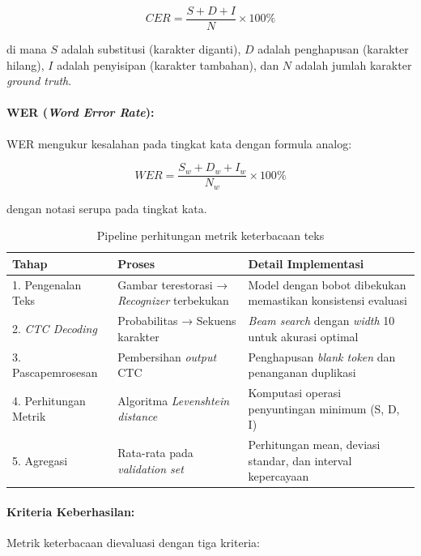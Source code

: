 \documentclass[12pt,a4paper]{article}
\begin{document}
\begin{equation}
CER = \frac{S + D + I}{N} \times 100\%
\end{equation}

di mana $S$ adalah substitusi (karakter diganti), $D$ adalah penghapusan (karakter hilang), $I$ adalah penyisipan (karakter tambahan), dan $N$ adalah jumlah karakter \textit{ground truth}.

\paragraph{WER (\textit{Word Error Rate}):}
WER mengukur kesalahan pada tingkat kata dengan formula analog:

\begin{equation}
WER = \frac{S_w + D_w + I_w}{N_w} \times 100\%
\end{equation}

dengan notasi serupa pada tingkat kata.

\begin{table}[H]
\centering
\caption{Pipeline perhitungan metrik keterbacaan teks}
\label{tab:readability-pipeline}
\small
\begin{tabular}{|l|p{5cm}|p{6cm}|}
\hline
\textbf{Tahap} & \textbf{Proses} & \textbf{Detail Implementasi} \\ \hline
1. Pengenalan Teks & Gambar terestorasi → \textit{Recognizer} terbekukan & Model dengan bobot dibekukan memastikan konsistensi evaluasi \\ \hline
2. \textit{CTC Decoding} & Probabilitas → Sekuens karakter & \textit{Beam search} dengan \textit{width} 10 untuk akurasi optimal \\ \hline
3. Pascapemrosesan & Pembersihan \textit{output} CTC & Penghapusan \textit{blank token} dan penanganan duplikasi \\ \hline
4. Perhitungan Metrik & Algoritma \textit{Levenshtein distance} & Komputasi operasi penyuntingan minimum (S, D, I) \\ \hline
5. Agregasi & Rata-rata pada \textit{validation set} & Perhitungan mean, deviasi standar, dan interval kepercayaan \\ \hline
\end{tabular}
\end{table}

\paragraph{Kriteria Keberhasilan:}
Metrik keterbacaan dievaluasi dengan tiga kriteria:
\end{document}
